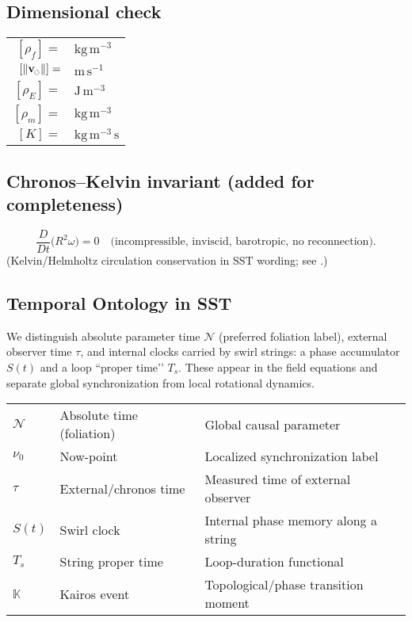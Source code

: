 \documentclass[11pt]{article}
\newcommand{\swirlarrow}{%
	\mathchoice{\mkern-2mu\scriptstyle\boldsymbol{\circlearrowleft}}%
	{\mkern-2mu\scriptstyle\boldsymbol{\circlearrowleft}}%
	{\mkern-2mu\scriptscriptstyle\boldsymbol{\circlearrowleft}}%
	{\mkern-2mu\scriptscriptstyle\boldsymbol{\circlearrowleft}}%
}
\newcommand{\vswirl}{\mathbf{v}_{\swirlarrow}}
\newcommand{\vnorm}{\lVert \vswirl \rVert}               %
\newcommand{\rhoF}{\rho_{\!f}}                           %
\newcommand{\rhoE}{\rho_{\!E}}                           %
\newcommand{\rhoM}{\rho_{\!m}}                           %
\newcommand{\ChronosKelvinEq}{\dfrac{D}{Dt}\!\big(R^{2}\omega\big)=0\quad\text{(incompressible, inviscid, barotropic, no reconnection)}.}
\begin{document}
	\subsection*{Dimensional check}
	\begin{center}
		\renewcommand{\arraystretch}{1.1}
		\begin{tabularx}{0.7\linewidth}{@{}rl@{}}
			$[\rhoF]=$   & $\mathrm{kg\,m^{-3}}$\\
			$[\vnorm]=$  & $\mathrm{m\,s^{-1}}$\\
			$[\rhoE]=$   & $\mathrm{J\,m^{-3}}$\\
			$[\rhoM]=$   & $\mathrm{kg\,m^{-3}}$\\
			$[K]=$       & $\mathrm{kg\,m^{-3}\,s}$\\
		\end{tabularx}
	\end{center}

	\subsection*{Chronos--Kelvin invariant (added for completeness)}
	\[
		\ChronosKelvinEq
	\]
	\noindent (Kelvin/Helmholtz circulation conservation in SST wording; see \cite{Helmholtz1858,Kelvin1869,Batchelor1967,Saffman1992}.)

	\subsection*{Temporal Ontology in SST}
	We distinguish absolute parameter time $\mathcal{N}$ (preferred foliation label), external observer time $\tau$, and internal clocks carried by swirl strings: a phase accumulator $S(t)$ and a loop “proper time’’ $T_{\!s}$. These appear in the field equations and separate global synchronization from local rotational dynamics.

	\begin{center}
		\scriptsize
		\begin{tabular}{lll}
			$\mathcal{N}$ & Absolute time (foliation) & Global causal parameter \\
			$\nu_0$       & Now-point                 & Localized synchronization label \\
			$\tau$        & External/chronos time     & Measured time of external observer \\
			$S(t)$        & Swirl clock               & Internal phase memory along a string \\
			$T_{\!s}$     & String proper time        & Loop-duration functional \\
			$\mathbb{K}$  & Kairos event              & Topological/phase transition moment \\
		\end{tabular}
	\end{center}
\end{document}
